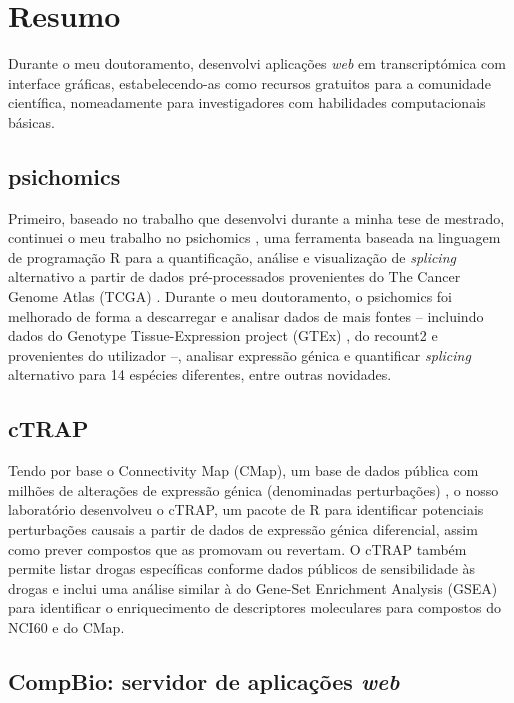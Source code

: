 \chapter*{Resumo}

Durante o meu doutoramento, desenvolvi aplicações \emph{web} em transcriptómica com interface gráficas, estabelecendo-as como recursos gratuitos para a comunidade científica, nomeadamente para investigadores com habilidades computacionais básicas.

\section*{psichomics}

Primeiro, baseado no trabalho que desenvolvi durante a minha tese de mestrado, continuei o meu trabalho no psichomics \cite{saraiva-agostinho:2018uq,saraiva-agostinho:2020wz}, uma ferramenta baseada na linguagem de programação R para a quantificação, análise e visualização de \emph{splicing} alternativo a partir de dados pré-processados provenientes do The Cancer Genome Atlas (TCGA) \cite{chang:2013ww}. Durante o meu doutoramento, o psichomics foi melhorado de forma a descarregar e analisar dados de mais fontes -- incluindo dados do Genotype Tissue-Expression project (GTEx) \cite{lonsdale:2013uo}, do recount2 \cite{collado-torres:2017uw} e provenientes do utilizador --, analisar expressão génica e quantificar \emph{splicing} alternativo para 14 espécies diferentes, entre outras novidades.

\section*{cTRAP}

Tendo por base o Connectivity Map (CMap), um base de dados pública com milhões de alterações de expressão génica (denominadas perturbações) \cite{subramanian:2017ul}, o nosso laboratório desenvolveu o cTRAP, um pacote de R para identificar potenciais perturbações causais a partir de dados de expressão génica diferencial, assim como prever compostos que as promovam ou revertam. O cTRAP também permite listar drogas específicas conforme dados públicos de sensibilidade às drogas e inclui uma análise similar à do Gene-Set Enrichment Analysis (GSEA) para identificar o enriquecimento de descriptores moleculares para compostos do NCI60 e do CMap.

\section*{CompBio: servidor de aplicações \emph{web}}

